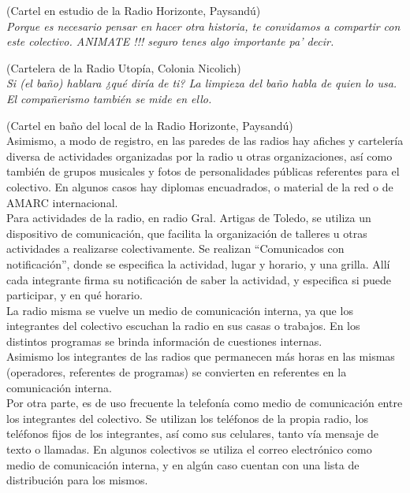 (Cartel en estudio de la Radio Horizonte, Paysandú)\\

\textit{Porque es necesario pensar en hacer otra historia, te convidamos a compartir con este colectivo. ANIMATE !!! seguro tenes algo importante pa' decir.}

(Cartelera de la Radio Utopía, Colonia Nicolich)\\

\textit{Si (el baño) hablara ¿qué diría de ti? La limpieza del baño habla de quien lo usa. El compañerismo también se mide en ello.}

(Cartel en baño del local de la Radio Horizonte, Paysandú)\\

Asimismo, a modo de registro, en las paredes de las radios hay afiches y cartelería diversa de actividades organizadas por la radio u otras organizaciones, así como también de grupos musicales y fotos de personalidades públicas referentes para el colectivo. En algunos casos hay diplomas encuadrados, o material de la red o de AMARC internacional.\\

Para actividades de la radio, en radio Gral. Artigas de Toledo, se utiliza un dispositivo de comunicación, que facilita la organización de talleres u otras actividades a realizarse colectivamente. Se realizan “Comunicados con notificación”, donde se especifica la actividad, lugar y horario, y una grilla. Allí cada integrante firma su notificación de saber la actividad, y especifica si puede participar, y en qué horario.\\

La radio misma se vuelve un medio de comunicación interna, ya que los integrantes del colectivo escuchan la radio en sus casas o trabajos. En los distintos programas se brinda información de cuestiones internas.\\

Asimismo los integrantes de las radios que permanecen más horas en las mismas (operadores, referentes de programas) se convierten en referentes en la comunicación interna.\\

Por otra parte, es de uso frecuente la telefonía como medio de comunicación entre los integrantes del colectivo. Se utilizan los teléfonos de la propia radio, los teléfonos fijos de los integrantes, así como sus celulares, tanto vía mensaje de texto o llamadas. En algunos colectivos se utiliza el correo electrónico como medio de comunicación interna, y en algún caso cuentan con una lista de distribución para los mismos.\\

